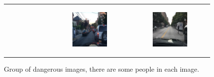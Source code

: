 \begin{figure}
\begin{tabular}{p{\horspace} p{\horspace} p{\horspace}}
\begin{subfigure}[b]{\subfigwidth}
    \end{subfigure}
    \hfill &
    \begin{subfigure}[b]{\subfigwidth}
        \includegraphics[width=\subfigwidth]{images/gpt4/d5.jpg}
    \end{subfigure} 
    \hfill &
    \begin{subfigure}[b]{\subfigwidth}
        \includegraphics[width=\subfigwidth]{images/gpt4/d6.jpg}
    \end{subfigure}
\end{tabular}
\caption[Group of dangerous images for common features' extraction.]
{Group of dangerous images, there are some people in each image.}
\label{fig:dangerous_group}
\end{figure}
